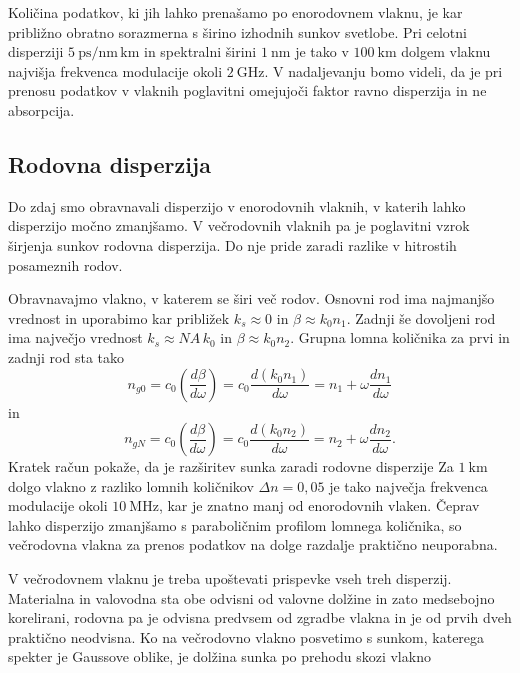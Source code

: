 Količina podatkov, ki jih lahko prenašamo po enorodovnem vlaknu, je kar približno obratno 
sorazmerna s širino izhodnih sunkov svetlobe. Pri celotni disperziji 
$5~\si{\pico\second/\nano\meter\,\kilo\meter}$ in 
spektralni širini $1~\si{\nano\meter}$ je tako v $100~\si{\kilo\meter}$ 
dolgem vlaknu najvišja frekvenca modulacije
okoli $2~\si{\giga\hertz}$. V nadaljevanju bomo videli, da je pri prenosu podatkov
v vlaknih poglavitni omejujoči faktor ravno disperzija in ne absorpcija. 

\subsection*{Rodovna disperzija}
Do zdaj smo obravnavali disperzijo v enorodovnih vlaknih, v katerih
lahko disperzijo močno zmanjšamo. V večrodovnih vlaknih pa
je poglavitni vzrok širjenja sunkov rodovna disperzija. Do nje pride zaradi razlike 
v hitrostih posameznih rodov. 

Obravnavajmo vlakno, v katerem se širi več rodov. Osnovni rod ima najmanjšo
vrednost in uporabimo kar približek $k_s \approx 0$ in $\beta \approx k_0 n_1$. 
Zadnji še dovoljeni rod ima
največjo vrednost $k_s \approx NA\, k_0$ in $\beta \approx k_0 n_2$. Grupna
lomna količnika za prvi in zadnji rod sta tako
\begin{equation}
n_{g0} = c_0 \left(\frac{d\beta}{d\omega}\right) = c_0 \frac{d(k_0n_1)}{d\omega} = 
n_1 + \omega \frac{dn_1}{d\omega}
\end{equation}
in
\begin{equation}
n_{gN} = c_0 \left(\frac{d\beta}{d\omega}\right) = c_0 \frac{d(k_0n_2)}{d\omega} = 
n_2 + \omega \frac{dn_2}{d\omega}.
\end{equation}
Kratek račun pokaže, da je razširitev sunka zaradi rodovne disperzije 
Za $1~\si{\kilo\meter}$ dolgo vlakno z razliko lomnih količnikov $\Delta n = 0,05$  je tako
največja frekvenca modulacije okoli $10~\si{\mega\hertz}$, kar je znatno manj od enorodovnih vlaken.
Čeprav lahko disperzijo zmanjšamo s paraboličnim profilom lomnega količnika, so
večrodovna vlakna za prenos podatkov na dolge razdalje praktično neuporabna. 

V večrodovnem vlaknu je treba upoštevati prispevke vseh treh disperzij. Materialna
in valovodna sta obe odvisni od valovne dolžine in zato medsebojno korelirani, rodovna pa 
je odvisna predvsem od zgradbe vlakna in je od prvih dveh praktično neodvisna. Ko na 
večrodovno vlakno posvetimo s sunkom, katerega spekter je Gaussove oblike, je dolžina 
sunka po prehodu skozi vlakno

